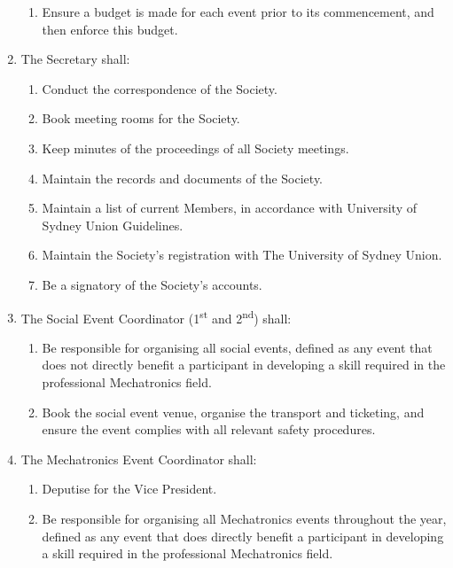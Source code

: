 \documentclass[11pt]{article}
\begin{document}
\begin{enumerate}[\thesection .1]
\begin{enumerate}
        \item Ensure a budget is made for each event prior to its commencement, and then enforce this budget.
    \end{enumerate}
    \item The Secretary shall:
    \begin{enumerate}
        \item Conduct the correspondence of the Society.
        \item Book meeting rooms for the Society.
        \item Keep minutes of the proceedings of all Society meetings.
        \item Maintain the records and documents of the Society.
        \item Maintain a list of current Members, in accordance with University of Sydney Union Guidelines.
        \item Maintain the Society’s registration with The University of Sydney Union.
        \item Be a signatory of the Society’s accounts.
    \end{enumerate}
    \item The Social Event Coordinator (1\textsuperscript{st} and 2\textsuperscript{nd}) shall:
    \begin{enumerate}
        \item Be responsible for organising all social events, defined as any event that does not directly benefit a participant in developing a skill required in the professional Mechatronics field.
        \item Book the social event venue, organise the transport and ticketing, and ensure the event complies with all relevant safety procedures.
    \end{enumerate}
    \item The Mechatronics Event Coordinator shall:
    \begin{enumerate}
        \item Deputise for the Vice President.
        \item Be responsible for organising all Mechatronics events throughout the year, defined as any event that does directly benefit a participant in developing a skill required in the professional Mechatronics field.

\end{enumerate}
\end{enumerate}
\end{document}

